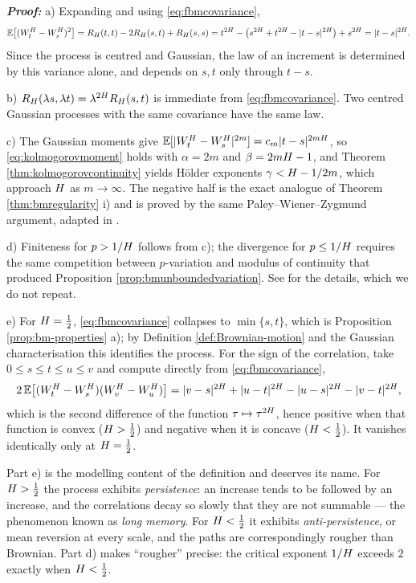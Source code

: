 \textbf{\textit{Proof:}} a) Expanding and using \eqref{eq:fbmcovariance},
\[
\mathbb{E}\bigl[(W^{H}_t-W^{H}_s)^2\bigr] = R_H(t,t) - 2R_H(s,t) + R_H(s,s)
= t^{2H} - \bigl(s^{2H}+t^{2H}-|t-s|^{2H}\bigr) + s^{2H} = |t-s|^{2H}.
\]
Since the process is centred and Gaussian, the law of an increment is determined by this variance
alone, and depends on $s,t$ only through $t-s$.

b) $R_H(\lambda s, \lambda t) = \lambda^{2H}R_H(s,t)$ is immediate from
\eqref{eq:fbmcovariance}. Two centred Gaussian processes with the same covariance have the same law.

c) The Gaussian moments give $\mathbb{E}[|W^{H}_t-W^{H}_s|^{2m}] = c_m|t-s|^{2mH}$, so
\eqref{eq:kolmogorovmoment} holds with $\alpha = 2m$ and $\beta = 2mH - 1$, and Theorem
\ref{thm:kolmogorovcontinuity} yields Hölder exponents $\gamma < H - 1/2m$, which approach
$H$ as $m\to\infty$. The negative half is the exact analogue of Theorem \ref{thm:bmregularity}
i) and is proved by the same Paley--Wiener--Zygmund argument, adapted in \cite[Ch.\ 7]{marcusrosen2006}.

d) Finiteness for $p>1/H$ follows from c); the divergence for $p\leq 1/H$ requires the
same competition between $p$-variation and modulus of continuity that produced Proposition
\ref{prop:bmunboundedvariation}. See \cite[Ch.\ 15]{frizvictoir2010} for the details, which we do
not repeat.

e) For $H=\tfrac12$, \eqref{eq:fbmcovariance} collapses to $\min\{s,t\}$, which is Proposition
\ref{prop:bm-properties} a); by Definition \ref{def:Brownian-motion} and the Gaussian
characterisation this identifies the process. For the sign of the correlation, take
$0\leq s\leq t\leq u\leq v$ and compute directly from \eqref{eq:fbmcovariance},
\[
2\,\mathbb{E}\bigl[(W^{H}_t-W^{H}_s)(W^{H}_v-W^{H}_u)\bigr] = |v-s|^{2H} + |u-t|^{2H} - |u-s|^{2H} - |v-t|^{2H},
\]
which is the second difference of the function $\tau \mapsto \tau^{2H}$, hence positive when
that function is convex ($H>\tfrac12$) and negative when it is concave ($H<\tfrac12$).
It vanishes identically only at $H = \tfrac12$. \qedfilledtext

\medskip

Part e) is the modelling content of the definition and deserves its name. For $H > \tfrac12$
the process exhibits \emph{persistence}: an increase tends to be followed by an increase, and the
correlations decay so slowly that they are not summable --- the phenomenon known as \emph{long
memory}. For $H < \tfrac12$ it exhibits \emph{anti-persistence}, or mean reversion at every
scale, and the paths are correspondingly rougher than Brownian. Part d) makes ``rougher'' precise:
the critical exponent $1/H$ exceeds $2$ exactly when $H < \tfrac12$.

